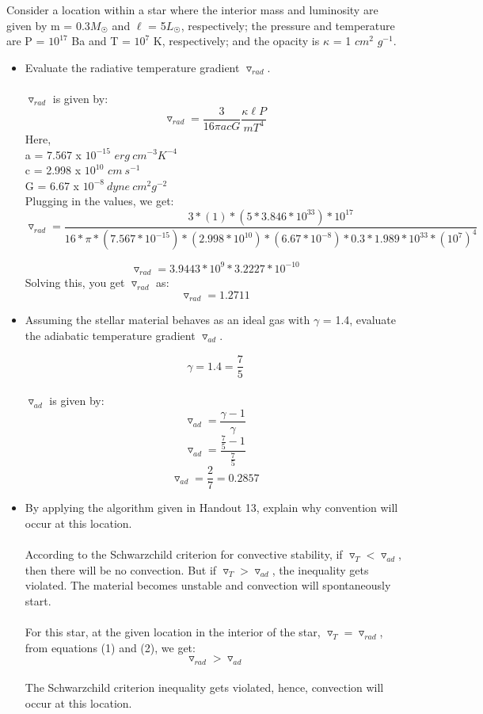 \documentclass[10pt]{article}
\begin{document}
Consider a location within a star where the interior mass and luminosity are given by m = 0.3$M_{\astrosun}$ and $\ell$ = 5$L_{\astrosun}$, respectively; the pressure and temperature are P = $10^{17}$ Ba and T = $10^7$ K, respectively; and the opacity is $\kappa$ = 1 $cm^{2}$ $g^{-1}$.
\begin{itemize}[label=\textbullet]
\item Evaluate the radiative temperature gradient $\triangledown_{rad}$.\\ \\
$\triangledown_{rad}$ is given by:
\[ \triangledown_{rad} = \frac{3}{16 \pi a c G} \frac{\kappa \ell P}{m T^{4}}\]
Here,\\
a = 7.567 x $10^{-15}$ $erg\ cm^{-3} K^{-4}$\\
c = 2.998 x $10^{10}$ $cm\ s^{-1}$\\
G = 6.67 x $10^{-8}\ dyne\ cm^{2}g^{-2}$
\\
Plugging in the values, we get:
\[ \triangledown_{rad} = \frac{3 * (1) * (5 * 3.846 * 10^{33}) * 10^{17}}{16* \pi * (7.567 * 10^{-15}) * (2.998 * 10^{10}) * (6.67 * 10^{-8}) * 0.3 * 1.989 * 10^{33} * {(10^{7})}^{4}}\]

\[ \triangledown_{rad} = 3.9443 * 10^{9} * 3.2227 * 10^{-10}\]
Solving this, you get $\triangledown_{rad}$ as:
\begin{equation}
    \triangledown_{rad} = 1.2711   \tag{1}
\end{equation}

\item Assuming the stellar material behaves as an ideal gas with $\gamma$ = 1.4, evaluate the adiabatic temperature gradient $\triangledown_{ad}$.

\[ \gamma = 1.4 = \frac{7}{5}\] \\
$\triangledown_{ad}$ is given by:
\[ \triangledown_{ad} = \frac{\gamma -1}{\gamma} \]
\[ \triangledown_{ad} = \frac{\frac{7}{5} - 1}{\frac{7}{5}}\]
\begin{equation}
    \triangledown_{ad} = \frac{2}{7} = 0.2857 \tag{2}
\end{equation}

\item By applying the algorithm given in Handout 13, explain why convention will occur at this location.
\\ \\
According to the Schwarzchild criterion for convective stability, if $\triangledown_{T} < \triangledown_{ad}$, then there will be no convection. But if $\triangledown_{T} > \triangledown_{ad}$, the inequality gets violated. The material becomes unstable and convection will spontaneously start.\\ \\
For this star, at the given location in the interior of the star, $\triangledown_{T} = \triangledown_{rad}$, from equations (1) and (2), we get:
\[ \triangledown_{rad} > \triangledown_{ad}\] \\
The Schwarzchild criterion inequality gets violated, hence, convection will occur at this location.


\end{itemize}
\end{document}
